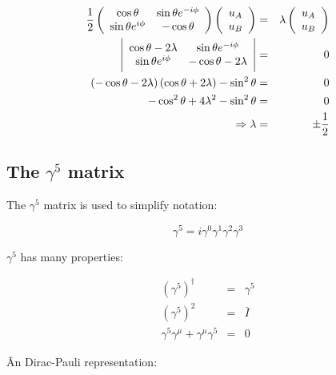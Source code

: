 \begin{eqnarray*}
  \frac{1}{2}
  \left(
    \begin{array}{cc}
    \cos\theta & \sin\theta e^{-i\phi} \\
    \sin\theta e^{i\phi} & -\cos\theta
    \end{array}
  \right)
  \left(
    \begin{array}{c}
    u_A \\
    u_B
    \end{array}
  \right)
  & = & \lambda
  \left(
    \begin{array}{c}
    u_A \\
    u_B
    \end{array}
  \right)
  \\
  \Bigg|
    \begin{array}{cc}
    \cos\theta - 2\lambda & \sin\theta e^{-i\phi} \\
    \sin\theta e^{i\phi} & -\cos\theta - 2\lambda
    \end{array}
  \Bigg|
  & = & 0 \\
  \left(-\cos\theta-2\lambda\right)\left(\cos\theta+2\lambda\right) - \sin^2\theta & = & 0 \\
  -\cos^2\theta + 4\lambda^2 - \sin^2\theta & = & 0 \\
  \Rightarrow \lambda & = & \pm\frac{1}{2}
\end{eqnarray*}

\subsection{The \texorpdfstring{$\gamma^5$}{G5} matrix}

The $\gamma^5$ matrix is used to simplify notation:

\[
  \gamma^5 = i\gamma^0\gamma^1\gamma^2\gamma^3
\]

$\gamma^5$ has many properties:

\begin{eqnarray*}
  \left(\gamma^5\right)^{\dagger} & = & \gamma^5 \\
  \left(\gamma^5\right)^2 & = & \bar{I} \\
  \gamma^5\gamma^{\mu} + \gamma^{\mu}\gamma^5 & = & 0
\end{eqnarray*}

Ãn Dirac-Pauli representation:

